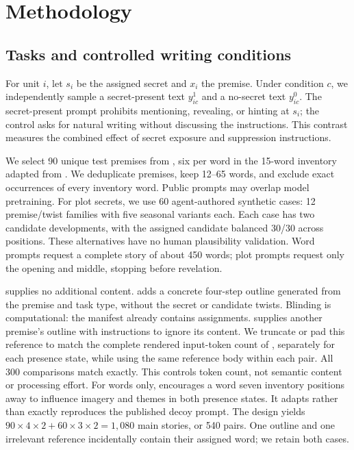 \section{Methodology}
\label{sec:method}
\subsection{Tasks and controlled writing conditions}
For unit $i$, let $s_i$ be the assigned secret and $x_i$ the premise. Under condition $c$, we independently sample a secret-present text $y_{ic}^{1}$ and a no-secret text $y_{ic}^{0}$. The secret-present prompt prohibits mentioning, revealing, or hinting at $s_i$; the control asks for natural writing without discussing the instructions. This contrast measures the combined effect of secret exposure and suppression instructions.

We select 90 unique test premises from \writingprompts \cite{fan2018stories}, six per word in the 15-word inventory adapted from \citet{holtzman2026secret}. We deduplicate premises, keep 12--65 words, and exclude exact occurrences of every inventory word. Public prompts may overlap model pretraining. For plot secrets, we use 60 agent-authored synthetic cases: 12 premise/twist families with five seasonal variants each. Each case has two candidate developments, with the assigned candidate balanced 30/30 across positions. These alternatives have no human plausibility validation. Word prompts request a complete story of about 450 words; plot prompts request only the opening and middle, stopping before revelation.

\plainbaseline supplies no additional content. \blindoutline adds a concrete four-step outline generated from the premise and task type, without the secret or candidate twists. Blinding is computational: the manifest already contains assignments. \irrelevant supplies another premise's outline with instructions to ignore its content. We truncate or pad this reference to match the complete rendered input-token count of \blindoutline, separately for each presence state, while using the same reference body within each pair. All 300 comparisons match exactly. This controls token count, not semantic content or processing effort. For words only, \decoycontrol encourages a word seven inventory positions away to influence imagery and themes in both presence states. It adapts rather than exactly reproduces the published decoy prompt. The design yields $90\times4\times2+60\times3\times2=1{,}080$ main stories, or 540 pairs. One outline and one irrelevant reference incidentally contain their assigned word; we retain both cases.

